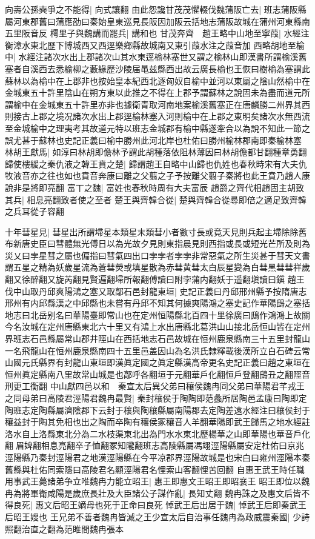 向壽公孫奭爭之不能得|{
	向式讓翻
	}
由此怨讒甘茂茂懼輟伐魏蒲阪亡去|{
	班志蒲阪縣屬河東郡舊曰蒲應劭曰秦始皇東巡見長阪因加阪云括地志蒲阪故城在蒲州河東縣南五里阪音反
	}
樗里子與魏講而罷兵|{
	講和也
	}
甘茂奔齊　趙王略中山地至寧葭|{
	水經注衡漳水東北歷下博城西又西逕樂鄉縣故城南又東引葭水注之葭音加
	}
西略胡地至榆中|{
	水經注諸次水出上郡諸次山其水東逕榆林塞世又謂之榆林山即漢書所謂榆溪舊塞者自溪西去悉榆柳之藪緣歷沙陵届㫣兹縣西出故云廣長榆也王恢曰樹榆為塞謂此蘇林以為榆中在上郡非也按始皇本紀西北逐匈奴自榆中並河以東屬之陰山然榆中在金城東五十許里陰山在朔方東以此推之不得在上郡予謂蘇林之說固未為盡而道元所謂榆中在金城東五十許里亦非也據衛青取河南地案榆溪舊塞正在唐麟勝二州界其西則接古上郡之境况諸次水出上郡逕榆林塞入河則榆中在上郡之東明矣諸次水無西流至金城榆中之理夷考其故道元特以班志金城郡有榆中縣遂牽合以為說不知此一節之誤尤甚于蘇林也史記正義曰榆中勝州此河北岸也杜佑曰勝州榆林郡南即秦榆林塞
	}
林胡王獻馬|{
	如淳曰林胡即儋林予謂此胡種落依阻林薄因曰林胡儋都甘翻種章勇翻
	}
歸使樓緩之秦仇液之韓王賁之楚|{
	歸謂趙王自略中山歸也仇姓也春秋時宋有大夫仇牧液音亦之往也如也賁音奔康曰離之父翦之子予按離父翦子秦將也此王賁乃趙人康說非是將即亮翻
	}
富丅之魏|{
	富姓也春秋時周有大夫富辰
	}
趙爵之齊代相趙固主胡致其兵|{
	相息亮翻致者使之至者
	}
楚王與齊韓合從|{
	楚與齊韓合從尋即倍之適足致齊韓之兵耳從子容翻
	}


十年彗星見|{
	彗星出所謂埽星本類星末類彗小者數寸長或竟天見則兵起主埽除除舊布新唐史臣曰彗體無光傅日以為光故夕見則東指晨見則西指或長或短光芒所及則為災乂曰孛星彗之屬也偏指曰彗氣四出口孛孛者孛孛非常惡氣之所生災甚于彗天文書謂五星之精為妖歲星流為蒼彗熒或填星散為赤彗黄彗太白辰星變為白彗黑彗彗祥歲翻又徐醉翻又旋芮翻見賢遍翻埽所報翻傅讀曰附孛蒲内翻妖于遥翻塡讀曰鎭
	}
趙王伐中山取丹邱爽陽鴻之塞又取鄗石邑封龍東垣|{
	史記正義曰丹邱邢州縣予按隋唐志邢州有内邱縣漢之中邱縣也未嘗有丹邱不知其何據爽陽鴻之塞史記作華陽䲭之塞括地志曰北岳别名曰華陽臺即常山也在定州恒陽縣北百四十里徐廣曰䲭作鴻鴻上故關今名汝城在定州唐縣東北六十里又有鴻上水出唐縣北葛洪山山接北岳恒山皆在定州界班志石邑縣屬常山郡井陘山在西括地志石邑故城在恒州鹿泉縣南三十五里封龍山一名飛龍山在恒州鹿泉縣南四十五里邑盖因山為名洪氏隸釋載後漢所立白石碑云常山國元氏縣界有封龍山東垣即漢眞定國之眞定縣漢高帝更名史記正義曰趙之東垣在恒州眞定縣南八里故常山城是也鄗呼各翻垣于元翻華戶化翻恒戶登翻䲭丑之翻陘音刑更工衡翻
	}
中山獻四邑以和　秦宣太后異父弟曰穰侯魏冉同父弟曰華陽君芊戎王之同母弟曰高陵君涇陽君魏冉最賢|{
	秦封穰侯于陶陶即范蠡所居陶邑孟康曰陶即定陶班志定陶縣屬濟陰郡下云封于穰與陶穰縣屬南陽郡去定陶差遠水經注曰穰侯封于穰益封于陶其免相也出之陶而卒陶有穰侯冢穰音人羊翻華陽即武王歸馬之地水經註洛水自上洛縣東北分為二水枝渠東北出為門水水東北歷楊華之山即華陽也華音戶化翻眉婢翻相息亮翻卒子恤翻冢知隴翻班志高陵縣屬馮翊涇陽縣屬安定杜佑曰京兆涇陽縣乃秦封涇陽君之地漢涇陽縣在今平凉郡界涇陽故城是也宋白曰雍州涇陽本秦舊縣與杜佑同索隱曰高陵君名顯涇陽君名悝索山客翻悝苦回翻
	}
自惠王武王時任職用事武王薨諸弟争立唯魏冉力能立昭王|{
	惠王即惠文王昭王即昭襄王
	}
昭王即位以魏冉為將軍衛咸陽是歲庶長壯及大臣諸公子謀作亂|{
	長知丈翻
	}
魏冉誅之及惠文后皆不得良死|{
	惠文后昭王嫡母也死于正命曰良死
	}
悼武王后出居于魏|{
	悼武王后即秦武王后昭王嫂也
	}
王兄弟不善者魏冉皆滅之王少宣太后自治事任魏冉為政威震秦國|{
	少詩照翻治直之翻為范睢間魏冉張本
	}



